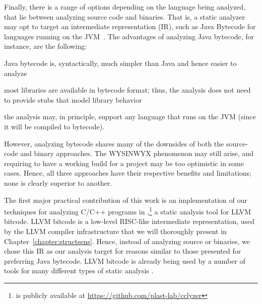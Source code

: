 Finally, there is a range of options depending on the language being
analyzed, that lie between analyzing source code and binaries. That
is, a static analyzer may opt to target an intermediate representation
(IR), such as Java Bytecode for languages running on the
JVM~\cite{Lindholm:1999:JVM:553607}. The advantages of analyzing Java
bytecode, for instance, are the following:
\begin{compactitem}[\(\cdot\)]
\item Java bytecode is, syntactically, much simpler than Java and
  hence easier to analyze
\item most libraries are available in bytecode format; thus, the
  analysis does not need to provide stubs that model library behavior
\item the analysis may, in principle, support any language that runs
  on the JVM (since it will be compiled to bytecode).
\end{compactitem}
However, analyzing bytecode shares many of the downsides of both the source-code and
binary approaches. The WYSINWYX phenomenon may still arise, and
requiring to have a working build for a project may be too optimistic
in some cases. Hence, all three approaches have their respective
benefits and limitations; none is clearly superior to another.

The first major practical contribution of this work is an
implementation of our techniques for analyzing C/C++ programs in
\cclyzer{},\footnote{\cclyzer{} is publicly available at
  \url{https://github.com/plast-lab/cclyzer}} a static analysis tool
for LLVM bitcode. LLVM bitcode is a low-level RISC-like intermediate
representation, used by the LLVM compiler infrastructure
\cite{cgo/LattnerA04} that we will thoroughly present in
Chapter~\ref{chapter:structsens}. Hence, instead of analyzing source
or binaries, we chose this IR as our analysis target for reasons
similar to those presented for preferring Java bytecode. LLVM bitcode
is already being used by a number of tools for many different types of
static analysis
\cite{cgo/HardekopfL11,sas/HenryMM12,popl/Lhotak11,cc/SuiX16,cav/LiGR11,sigsoft/LiCK10}.

